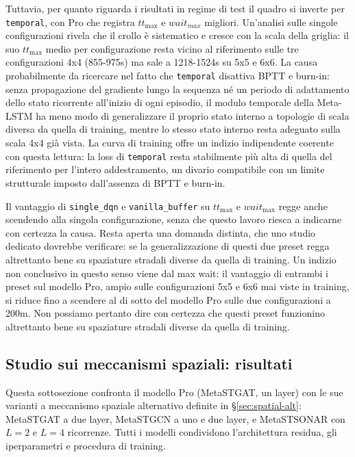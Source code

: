 Tuttavia, per quanto riguarda i risultati in regime di test
il quadro si inverte per \texttt{temporal}, con Pro che registra $tt_{\max}$ e $wait_{max}$ migliori.
Un'analisi sulle singole configurazioni rivela che il crollo è sistematico
e cresce con la scala della griglia: il suo $tt_{\max}$ medio per
configurazione resta vicino al riferimento sulle tre configurazioni 4x4
(855-975s) ma sale a 1218-1524s su 5x5 e 6x6.
La causa probabilmente da ricercare nel fatto che \texttt{temporal} disattiva BPTT e burn-in: senza propagazione del gradiente
lungo la sequenza né un periodo di adattamento dello stato ricorrente
all'inizio di ogni episodio, il modulo temporale della Meta-LSTM ha meno
modo di generalizzare il proprio stato interno a topologie di scala
diversa da quella di training, mentre lo stesso stato interno resta
adeguato sulla scala 4x4 già vista. La curva di training offre un
indizio indipendente coerente con questa lettura: la loss di
\texttt{temporal} resta stabilmente più alta di quella del riferimento
per l'intero addestramento, un divario compatibile con
un limite strutturale imposto dall'assenza di BPTT e burn-in.

Il vantaggio di \texttt{single\_dqn} e \texttt{vanilla\_buffer} su
$tt_{\max}$ e $wait_{\max}$ regge anche scendendo alla singola configurazione,
senza che questo lavoro riesca a indicarne con certezza la causa. Resta
aperta una domanda distinta, che uno studio dedicato dovrebbe verificare:
se la generalizzazione di questi due preset regga altrettanto bene su
spaziature stradali diverse da quella di training. Un indizio non
conclusivo in questo senso viene dal max wait: il vantaggio di entrambi i
preset sul modello Pro, ampio sulle configurazioni 5x5 e 6x6
mai viste in training, si riduce fino a scendere al di sotto del modello Pro sulle due configurazioni
a 200m. Non possiamo pertanto dire con certezza che questi preset funzionino altrettanto bene su spaziature stradali diverse da quella di training.

\subsection{Studio sui meccanismi spaziali: risultati}
\label{sec:confronto-spaziale}

Questa sottosezione confronta il modello Pro (MetaSTGAT, un layer)
con le sue varianti a meccanismo spaziale alternativo definite in
§\ref{sec:spatial-alt}: MetaSTGAT a due layer, MetaSTGCN a uno e due
layer, e MetaSTSONAR con $L=2$ e $L=4$ ricorrenze. Tutti i modelli
condividono l'architettura residua, gli iperparametri e procedura di training.


